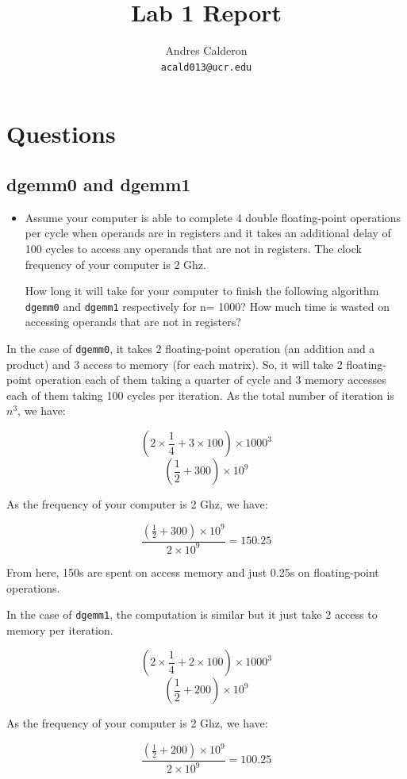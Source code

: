 \documentclass[10pt]{scrartcl}
\title{Lab 1 Report}
\author{
   Andres Calderon\\
  \small \texttt{acald013@ucr.edu}
}
\begin{document}
\maketitle

\section{Questions}
\subsection{dgemm0 and dgemm1}
\begin{itemize}
 \item Assume your computer is able to complete 4 double floating-point operations per cycle when operands are in registers and it takes an additional delay of 100 cycles to access any operands that are not in registers. The clock frequency of your computer is 2 Ghz.

How long it will take for your computer to finish the following algorithm \texttt{dgemm0} and \texttt{dgemm1} respectively for n= 1000?  How much time is wasted on accessing operands that are not in registers? 
\end{itemize}



In the case of \texttt{dgemm0}, it takes $2$ floating-point operation (an addition and a product) and $3$ access to memory (for each matrix). So, it will take 2 floating-point operation each of them taking a quarter of cycle and 3 memory accesses each of them taking 100 cycles per iteration.  As the total number of iteration is $n^3$, we have:

$$(2 \times \frac{1}{4} + 3 \times 100) \times 1000^3$$
$$(\frac{1}{2} + 300) \times 10^9$$

As the frequency of your computer is 2 Ghz, we have:

$$\frac{(\frac{1}{2} + 300) \times 10^9}{2 \times 10^9} = 150.25$$

From here, 150s are spent on access memory and just 0.25s on floating-point operations.

In the case of \texttt{dgemm1}, the computation is similar but it just take 2 access to memory per iteration.

$$(2 \times \frac{1}{4} + 2 \times 100) \times 1000^3$$
$$(\frac{1}{2} + 200) \times 10^9$$

As the frequency of your computer is 2 Ghz, we have:

$$\frac{(\frac{1}{2} + 200) \times 10^9}{2 \times 10^9} = 100.25$$
\end{document}
